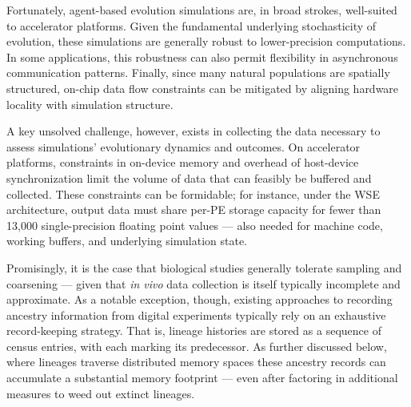 Fortunately, agent-based evolution simulations are, in broad strokes, well-suited to accelerator platforms.
Given the fundamental underlying stochasticity of evolution, these simulations are generally robust to lower-precision computations.
In some applications, this robustness can also permit flexibility in asynchronous communication patterns.
Finally, since many natural populations are spatially structured, on-chip data flow constraints can be mitigated by aligning hardware locality with simulation structure.

A key unsolved challenge, however, exists in collecting the data necessary to assess simulations' evolutionary dynamics and outcomes.
On accelerator platforms, constraints in on-device memory and overhead of host-device synchronization limit the volume of data that can feasibly be buffered and collected.
These constraints can be formidable;
for instance, under the WSE architecture, output data must share per-PE storage capacity for fewer than 13,000 single-precision floating point values --- also needed for machine code, working buffers, and underlying simulation state.

Promisingly, it is the case that biological studies generally tolerate sampling and coarsening --- given that \textit{in vivo} data collection is itself typically incomplete and approximate.
As a notable exception, though, existing approaches to recording ancestry information from digital experiments typically rely on an exhaustive record-keeping strategy.
That is, lineage histories are stored as a sequence of census entries, with each marking its predecessor.
As further discussed below, where lineages traverse distributed memory spaces these ancestry records can accumulate a substantial memory footprint --- even after factoring in additional measures to weed out extinct lineages.

